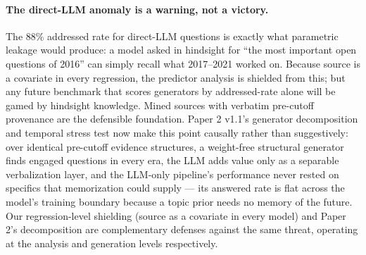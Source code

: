 \documentclass[11pt]{article}
\begin{document}
\paragraph{The direct-LLM anomaly is a warning, not a victory.} The 88\%
addressed rate for direct-LLM questions is exactly what parametric
leakage would produce: a model asked in hindsight for ``the most
important open questions of 2016'' can simply recall what 2017--2021
worked on. Because source is a covariate in every regression, the
predictor analysis is shielded from this; but any future benchmark that
scores generators by addressed-rate alone will be gamed by hindsight
knowledge. Mined sources with verbatim pre-cutoff provenance are the
defensible foundation. Paper 2 v1.1's generator decomposition and
temporal stress test now make this point causally rather than
suggestively: over identical pre-cutoff evidence structures, a
weight-free structural generator finds engaged questions in every era,
the LLM adds value only as a separable verbalization layer, and the
LLM-only pipeline's performance never rested on specifics that
memorization could supply --- its answered rate is flat across the
model's training boundary because a topic prior needs no memory of the
future. Our regression-level shielding (source as a covariate in every
model) and Paper 2's decomposition are complementary defenses against
the same threat, operating at the analysis and generation levels
respectively.
\end{document}
